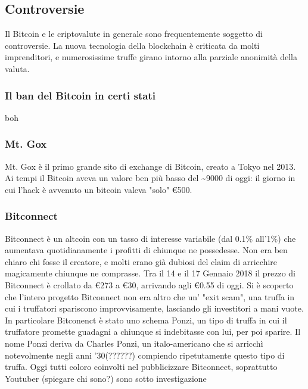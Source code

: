 \documentclass {article}
\begin{document}
{\subsection {Controversie}


Il Bitcoin e le criptovalute in generale sono frequentemente soggetto di controversie. La nuova tecnologia della blockchain è criticata da molti imprenditori, e numerosissime truffe girano intorno alla parziale anonimità della valuta.


\subsubsection {Il ban del Bitcoin in certi stati}


boh


\subsubsection {Mt. Gox}


Mt. Gox è il primo grande sito di exchange di Bitcoin, creato a Tokyo nel 2013.
Ai tempi il Bitcoin aveva un valore ben più basso del \textasciitilde 9000 di oggi: il giorno in cui l'hack è avvenuto un bitcoin valeva "solo" \euro{500}.


\subsubsection {Bitconnect}


Bitconnect è un altcoin con un tasso di interesse variabile (dal 0.1\% all'1\%) che aumentava quotidianamente i profitti di chiunque ne possedesse.
Non era ben chiaro chi fosse il creatore, e molti erano già dubiosi del claim di arricchire magicamente chiunque ne comprasse.
Tra il 14 e il 17 Gennaio 2018 il prezzo di Bitconnect è crollato da \euro{273} a \euro{30}, arrivando agli \euro{0.55} di oggi.
Si è scoperto che l'intero progetto Bitconnect non era altro che un' "exit scam", una truffa in cui i truffatori spariscono improvvisamente, lasciando gli investitori a mani vuote.
In particolare Bitconenct è stato uno schema Ponzi, un tipo di truffa in cui il truffatore promette guadagni a chiunque si indebitasse con lui, per poi sparire.
Il nome Ponzi deriva da Charles Ponzi, un italo-americano che si arricchì notevolmente negli anni '30(??????) compiendo ripetutamente questo tipo di truffa.
Oggi tutti coloro coinvolti nel pubblicizzare Bitconnect, soprattutto Youtuber (spiegare chi sono?) sono sotto investigazione


}
\end{document}
